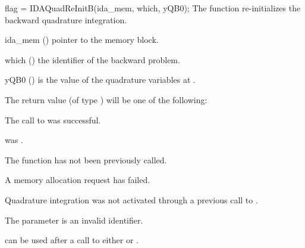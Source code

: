 {
  flag = IDAQuadReInitB(ida\_mem, which, yQB0);
}
{
  The function  re-initializes the backward quadrature integration.
}
{
  \begin{args}
  \item[ida\_mem] ()
    pointer to the {\idas} memory block.
  \item[which] ()
    the identifier of the backward problem.
  \item[yQB0] ()
    is the value of the quadrature variables at .
  \end{args}
}
{
  The return value  (of type ) will be one of the following:
  \begin{args}
  \item[\Id{IDA\_SUCCESS}]
    The call to  was successful.
 \item[\Id{IDA\_MEM\_NULL}]
     was .
  \item[\Id{IDA\_NO\_ADJ}]
    The function  has not been previously called.
  \item[\Id{IDA\_MEM\_FAIL}]
    A memory allocation request has failed.
  \item[\Id{IDA\_NO\_QUAD}]
    Quadrature integration was not activated through a  previous
    call to .
  \item[\Id{IDA\_ILL\_INPUT}]
    The parameter  is an invalid identifier.
  \end{args}
}
{
   can be used after a call to either 
  or .
}

